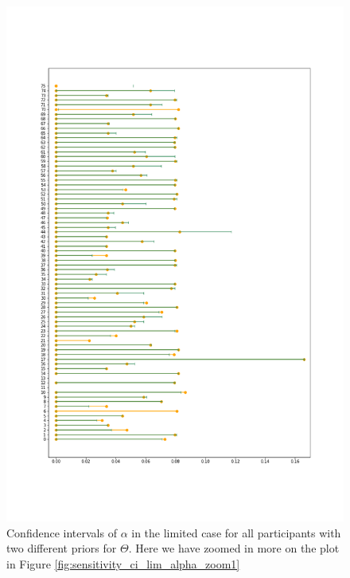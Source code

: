 \begin{figure}
    \centering
    \includegraphics[scale=0.36]{pictures/Sensitivity/ci_lim_alpha_zoom2.png}
    \caption[CIs for $\alpha$ in the limited case, zoomed]{   Confidence intervals of $\alpha$ in the limited case for all participants with two different priors for $\Theta$. Here we have zoomed in more on the plot in Figure \ref{fig:sensitivity_ci_lim_alpha_zoom1}}
    \label{fig:sensitivity_cis_lim_alpha_zoom2}
\end{figure}

